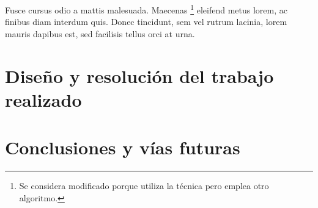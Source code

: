 Fusce cursus odio a mattis malesuada. Maecenas \footnote{Se considera modificado porque utiliza la técnica pero emplea otro algoritmo.} eleifend metus lorem, ac finibus diam interdum quis. Donec tincidunt, sem vel rutrum lacinia, lorem mauris dapibus est, sed facilisis tellus orci at urna.


\chapter{Diseño y resolución del trabajo realizado}




\chapter{Conclusiones y vías futuras}



